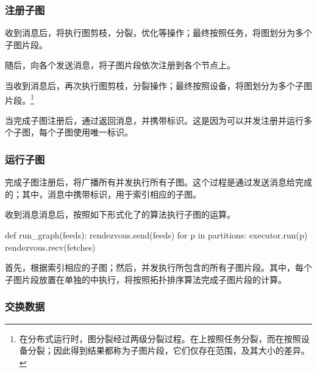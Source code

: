 \begin{content}
\subsubsection{注册子图}

收到消息后，将执行图剪枝，分裂，优化等操作；最终按照任务，将图划分为多个子图片段。

随后，向各个发送消息，将子图片段依次注册到各个节点上。

当收到消息后，再次执行图剪枝，分裂操作；最终按照设备，将图划分为多个子图片段。\footnote{在分布式运行时，图分裂经过两级分裂过程。在上按照任务分裂，而在按照设备分裂；因此得到结果都称为子图片段，它们仅存在范围，及其大小的差异。}

当完成子图注册后，通过返回消息，并携带标识。这是因为可以并发注册并运行多个子图，每个子图使用唯一标识。

\subsubsection{运行子图}

完成子图注册后，将广播所有并发执行所有子图。这个过程是通过发送消息给完成的；其中，消息中携带标识，用于索引相应的子图。

收到消息消息后，按照如下形式化了的算法执行子图的运算。

\begin{leftbar}
  \begin{python}
def run_graph(feeds):
  rendezvous.send(feeds)
  for p in partitions: 
    executor.run(p)
  rendezvous.recv(fetches)
  \end{python}
\end{leftbar}

首先，根据索引相应的子图；然后，并发执行所包含的所有子图片段。其中，每个子图片段放置在单独的中执行，将按照拓扑排序算法完成子图片段的计算。

\subsubsection{交换数据}


\end{content}
